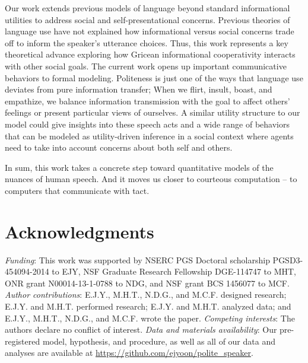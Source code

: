 \documentclass[12pt]{article}
\begin{document}
Our work extends previous models of language beyond standard
informational utilities to address social and self-presentational
concerns. Previous theories of language use have not explained how
informational versus social concerns trade off to inform the speaker's
utterance choices. Thus, this work represents a key theoretical advance
exploring how Gricean informational cooperativity interacts with other
social goals. The current work opens up important communicative
behaviors to formal modeling. Politeness is just one of the ways that
language use deviates from pure information transfer; When we flirt,
insult, boast, and empathize, we balance information transmission with
the goal to affect others' feelings or present particular views of
ourselves. A similar utility structure to our model could give insights
into these speech acts and a wide range of behaviors that can be modeled
as utility-driven inference in a social context \cite{baker2017rational, hamlin2013mentalistic} 
where agents need to take into account concerns about both self
and others.


In sum, this work takes a concrete step toward quantitative models of
the nuances of human speech. And it moves us closer to courteous
computation -- to computers that communicate with tact.












\section*{Acknowledgments}
\emph{Funding}: This work was supported by NSERC PGS Doctoral scholarship
PGSD3-454094-2014 to EJY, NSF Graduate Research Fellowship DGE-114747 to
MHT, ONR grant N00014-13-1-0788 to NDG, and NSF grant BCS 1456077 to
MCF. 
\emph{Author contributions}: E.J.Y., M.H.T., N.D.G., and M.C.F. designed research; 
E.J.Y. and M.H.T. performed research; E.J.Y. and M.H.T. analyzed data; and E.J.Y., M.H.T., N.D.G., and M.C.F. wrote the paper.
\emph{Competing interests}: The authors declare no conflict of interest.
\emph{Data and materials availability}: Our pre-registered model,
hypothesis, and procedure, as well as all of our data and analyses are available at
\url{https://github.com/ejyoon/polite_speaker}.
\end{document}
